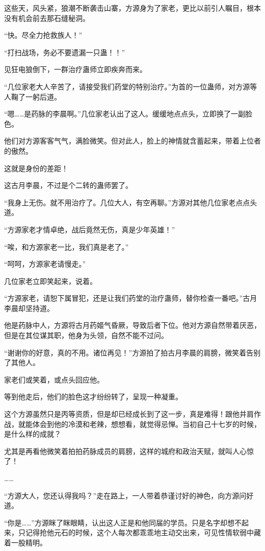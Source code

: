 \begin{this_body}
这些天，风头紧，狼潮不断袭击山寨，方源身为了家老，更比以前引人瞩目，根本没有机会前去那石缝秘洞。

“快。尽全力抢救族人！”

“打扫战场，务必不要遗漏一只蛊！！”

见狂电狼倒下，一群治疗蛊师立即疾奔而来。

“几位家老大人辛苦了，请接受我们药堂的特别治疗。”为首的一位蛊师，对方源等人鞠了一躬后道。

“嗯……是药脉的李晨啊。”几位家老认出了这人。缓缓地点点头，立即换了一副脸色。

他们对方源客客气气，满脸微笑。但对此人，脸上的神情就含蓄起来，带着上位者的傲然。

这就是身份的差距！

这古月李晨，不过是个二转的蛊师罢了。

“我身上无伤。就不用治疗了。几位大人，有空再聊。”方源对其他几位家老点点头道。

“方源家老才情卓绝，战后竟然无伤，真是少年英雄！”

“唉，和方源家老一比，我们真是老了。”

“呵呵，方源家老请慢走。”

几位家老立即笑起来，说着。

“方源家老，请恕下属冒犯，还是让我们药堂的治疗蛊师，替你检查一番吧。”古月李晨却坚持道。

他是药脉中人，方源将古月药姬气昏厥，导致后者下位。他对方源自然带着厌恶，但是在其位谋其职，他身为头领，自然不能不过问。

“谢谢你的好意，真的不用。诸位再见！”方源拍了拍古月李晨的肩膀，微笑着告别了其他人。

家老们或笑着，或点头回应他。

等到他走后，他们的脸色这才纷纷转了，呈现一种凝重。

这个方源虽然只是丙等资质，但是却已经成长到了这一步，真是难得！跟他并肩作战，就能体会到他的冷漠和老辣，想想看，就觉得忌惮。当初自己十七岁的时候，是什么样的成就？

尤其是再看他微笑着拍拍药脉成员的肩膀，这样的城府和政治天赋，就叫人心惊了！

……

“方源大人，您还认得我吗？”走在路上，一人带着恭谨讨好的神色，向方源问好道。

“你是……”方源眯了眯眼睛，认出这人正是和他同届的学员。只是名字却想不起来，只记得抢他元石的时候，这个人每次都乖乖地主动交出来，可见性情软弱中藏着一股精明。


\end{this_body}

